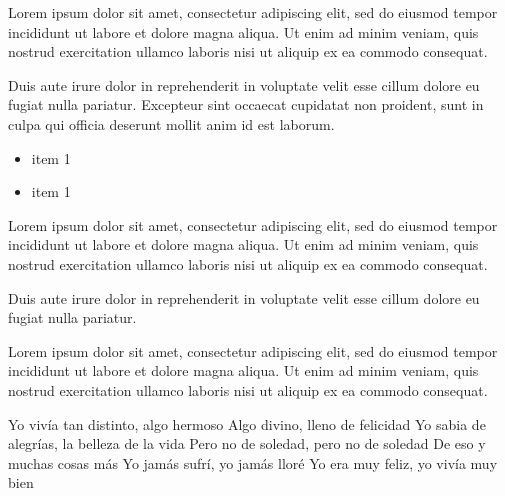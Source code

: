 \documentclass[a4paper,12pt]{extarticle}
\begin{document}
Lorem ipsum dolor sit amet, consectetur adipiscing elit, sed do eiusmod tempor incididunt ut labore et dolore magna aliqua. Ut enim ad minim veniam, quis nostrud exercitation ullamco laboris nisi ut aliquip ex ea commodo consequat.\\


Duis aute irure dolor in reprehenderit in voluptate velit esse cillum dolore eu fugiat nulla pariatur. Excepteur sint occaecat cupidatat non proident, sunt in culpa qui officia deserunt mollit anim id est laborum.

 \label{q:vraagvb}
\begin{itemize}
    \item item 1
    \item item 1
\end{itemize}
Lorem ipsum dolor sit amet, consectetur adipiscing elit, sed do eiusmod tempor incididunt ut labore et dolore magna aliqua. Ut enim ad minim veniam, quis nostrud exercitation ullamco laboris nisi ut aliquip ex ea commodo consequat. 

Duis aute irure dolor in reprehenderit in voluptate velit esse cillum dolore eu fugiat nulla pariatur.\newline

Lorem ipsum dolor sit amet, consectetur adipiscing elit, sed do eiusmod tempor incididunt ut labore et dolore magna aliqua. Ut enim ad minim veniam, quis nostrud exercitation ullamco laboris nisi ut aliquip ex ea commodo consequat. 

Yo vivía tan distinto, algo hermoso
Algo divino, lleno de felicidad
Yo sabia de alegrías, la belleza de la vida
Pero no de soledad, pero no de soledad
De eso y muchas cosas más
Yo jamás sufrí, yo jamás lloré
Yo era muy feliz, yo vivía muy bien

\insertemptypage %


\end{document}
